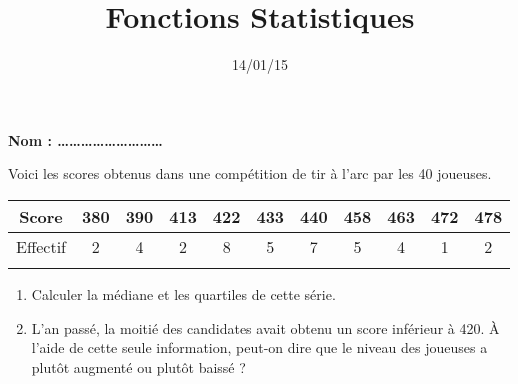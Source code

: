 \documentclass[12pt]{article}
\title{Fonctions Statistiques}
\date{14/01/15}
\begin{document}
\textbf{\Large Nom : \ldots\ldots\ldots\ldots\ldots\ldots\ldots\ldots\ldots}
\vspace{.5cm}

\maketitle

\begin{exercice}
  Voici les scores obtenus dans une compétition de tir à l'arc par
  les 40 joueuses.

  \begin{tabular}{c||c|c|c|c|c|c|c|c|c|c}
    Score
    & 380
    & 390
    & 413
    & 422
    & 433
    & 440
    & 458
    & 463
    & 472
    & 478
    \\
    \hline
    Effectif
    & 2
    & 4
    & 2
    & 8
    & 5
    & 7
    & 5
    & 4
    & 1
    & 2
    \\
    \hline
    &&&&&&&&&&
  \end{tabular}

  \begin{enumerate}
  \item Calculer la médiane et les quartiles de cette série.
  \item L'an passé, la moitié des candidates avait obtenu un score inférieur à
    420. À l'aide de cette seule information, peut-on dire que le niveau des
    joueuses a plutôt augmenté ou plutôt baissé ?
  \end{enumerate}

\end{exercice}
\end{document}
